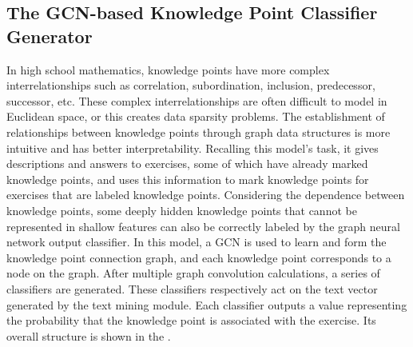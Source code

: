 \subsection{The GCN-based Knowledge Point Classifier Generator}


In high school mathematics, knowledge points have more complex interrelationships such as correlation, subordination, inclusion, predecessor, successor, etc. These complex interrelationships are often difficult to model in Euclidean space, or this creates data sparsity problems. The establishment of relationships between knowledge points through graph data structures is more intuitive and has better interpretability. Recalling this model's task, it gives descriptions and answers to exercises, some of which have already marked knowledge points, and uses this information to mark knowledge points for exercises that are labeled knowledge points. Considering the dependence between knowledge points, some deeply hidden knowledge points that cannot be represented in shallow features can also be correctly labeled by the graph neural network output classifier. In this model, a GCN is used to learn and form the knowledge point connection graph, and each knowledge point corresponds to a node on the graph. After multiple graph convolution calculations, a series of classifiers are generated. These classifiers respectively act on the text vector generated by the text mining module. Each classifier outputs a value representing the probability that the knowledge point is associated with the exercise. Its overall structure is shown in the \figname{\ref{fig:ch2-gcn-ov}}.

